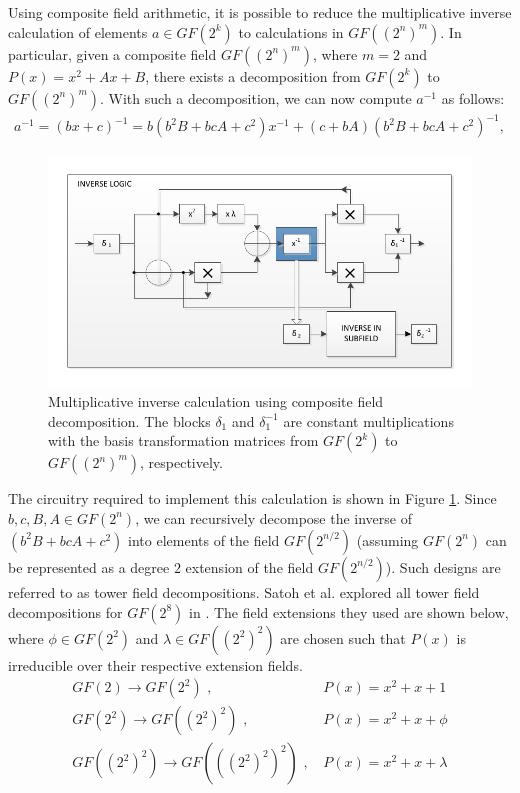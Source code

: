 Using composite field arithmetic, it is possible to reduce the multiplicative
inverse calculation of elements $a \in GF(2^k)$ to calculations in $GF((2^n)^m)$.
In particular, given a composite field $GF((2^n)^m)$, where $m = 2$ and $P(x) = x^2 + Ax + B$,
there exists a decomposition from $GF(2^k)$ to $GF((2^n)^m)$. With such a
decomposition, we can now compute $a^{-1}$ as follows:
\begin{align}
a^{-1} = (bx + c)^{-1} = b(b^2B + bcA + c^2)x^{-1} + (c + bA)(b^2B + bcA + c^2)^{-1},
\end{align}
\begin{figure}[ht!]
\begin{center}
	\includegraphics{images/composite_field_inverter.pdf}
\end{center}
\caption{Multiplicative inverse calculation using composite field decomposition. The blocks $\delta_1$ and
$\delta_1^{-1}$ are constant multiplications with the basis transformation matrices from $GF(2^k)$ to
$GF((2^n)^m)$, respectively. }
\label{fig:compositeFieldInverse}
\end{figure}
The circuitry required to implement this calculation is shown in Figure \ref{fig:compositeFieldInverse}. 
Since $b, c, B, A \in GF(2^n)$, we can recursively decompose the inverse of $(b^2B + bcA + c^2)$ into
elements of the field $GF(2^{n/2})$ (assuming $GF(2^n)$ can be represented as a degree $2$ extension
of the field $GF(2^{n/2})$). Such designs are referred to as tower field decompositions. Satoh et al.
explored all tower field decompositions for $GF(2^8)$ in \cite{Satoh01-1}. The field extensions they 
used are shown below, where $\phi \in GF(2^2)$ and $\lambda \in GF((2^2)^2)$ are chosen such that $P(x)$
is irreducible over their respective extension fields.
\begin{align*}
GF(2) \to GF(2^2)\text{ , }& P(x) = x^2 + x + 1 \\
GF(2^2) \to GF((2^2)^2)\text{ , }& P(x) = x^2 + x + \phi \\
GF((2^2)^2) \to GF(((2^2)^2)^2)\text{ , }& P(x) = x^2 + x + \lambda 
\end{align*}
